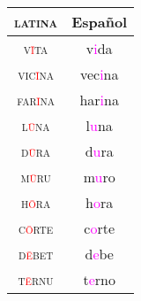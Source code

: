 \documentclass{beamer}
\begin{document}
\begin{frame}
	\begin{center}
		\begin{tabular}{c c}
			\textsc{latina}                      & Español                     \\
			\hline
			\textsc{v\textcolor{red}{\={i}}ta}   & v\textcolor{magenta}{i}da   \\
			\textsc{vic\textcolor{red}{\={i}}na} & vec\textcolor{magenta}{i}na \\
			\textsc{far\textcolor{red}{\={i}}na} & har\textcolor{magenta}{i}na \\
			\textsc{l\textcolor{red}{\={u}}na}   & l\textcolor{magenta}{u}na   \\
			\textsc{d\textcolor{red}{\={u}}ra}   & d\textcolor{magenta}{u}ra   \\
			\textsc{m\textcolor{red}{\={u}}ru}   & m\textcolor{magenta}{u}ro   \\
			\textsc{h\textcolor{red}{\={o}}ra}   & h\textcolor{magenta}{o}ra   \\
			\textsc{c\textcolor{red}{\={o}}rte}  & c\textcolor{magenta}{o}rte  \\
			\textsc{d\textcolor{red}{\={e}}bet}  & d\textcolor{magenta}{e}be   \\
			\textsc{t\textcolor{red}{\={e}}rnu}  & t\textcolor{magenta}{e}rno  \\
		\end{tabular}
	\end{center}

\end{frame}
\end{document}
